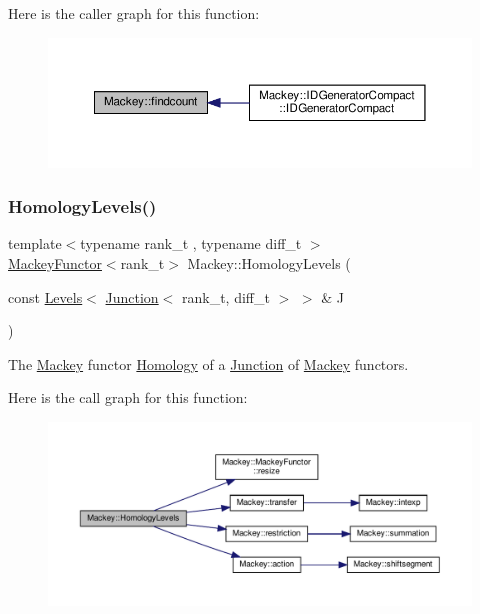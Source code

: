 Here is the caller graph for this function\+:\nopagebreak
\begin{figure}[H]
\begin{center}
\leavevmode
\includegraphics[width=350pt]{namespaceMackey_a1a7a26880f8c7c087503e2bc16168d3c_icgraph}
\end{center}
\end{figure}
\mbox{\label{namespaceMackey_a1c195484cc947abef84c726b534af5a5}} 
\subsubsection{\texorpdfstring{Homology\+Levels()}{HomologyLevels()}}
{\footnotesize\ttfamily template$<$typename rank\+\_\+t , typename diff\+\_\+t $>$ \\
\hyperlink{classMackey_1_1MackeyFunctor}{Mackey\+Functor}$<$rank\+\_\+t$>$ Mackey\+::\+Homology\+Levels (\begin{DoxyParamCaption}\item[{const \hyperlink{classMackey_1_1Levels}{Levels}$<$ \hyperlink{classMackey_1_1Junction}{Junction}$<$ rank\+\_\+t, diff\+\_\+t $>$ $>$ \&}]{J }\end{DoxyParamCaption})}



The \hyperlink{namespaceMackey}{Mackey} functor \hyperlink{classMackey_1_1Homology}{Homology} of a \hyperlink{classMackey_1_1Junction}{Junction} of \hyperlink{namespaceMackey}{Mackey} functors. 

Here is the call graph for this function\+:\nopagebreak
\begin{figure}[H]
\begin{center}
\leavevmode
\includegraphics[width=350pt]{namespaceMackey_a1c195484cc947abef84c726b534af5a5_cgraph}
\end{center}
\end{figure}
\mbox{\label{namespaceMackey_a3fa96ba9b7316a92eca2f5c0bd1cca4d}} 
